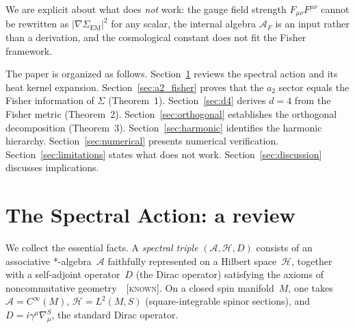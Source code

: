 \documentclass[prd,twocolumn,superscriptaddress,longbibliography]{revtex4-2}
\newcommand{\AF}{\mathcal{A}_F}
\newcommand{\known}{\textsc{[known]}}
\begin{document}
We are explicit about what does \emph{not} work: the gauge
field strength $F_{\mu\nu}F^{\mu\nu}$ cannot be rewritten as
$|\nabla\Sigma_{\mathrm{EM}}|^2$ for any scalar, the internal
algebra $\AF$ is an input rather than a derivation, and the
cosmological constant does not fit the Fisher framework.

The paper is organized as follows.
Section~\ref{sec:spectral_review} reviews the spectral action
and its heat kernel expansion.
Section~\ref{sec:a2_fisher} proves that the $a_2$ sector
equals the Fisher information of $\Sigma$ (Theorem~1).
Section~\ref{sec:d4} derives $d=4$ from the Fisher metric
(Theorem~2).
Section~\ref{sec:orthogonal} establishes the orthogonal
decomposition (Theorem~3).
Section~\ref{sec:harmonic} identifies the harmonic hierarchy.
Section~\ref{sec:numerical} presents numerical verification.
Section~\ref{sec:limitations} states what does not work.
Section~\ref{sec:discussion} discusses implications.


\section{The Spectral Action: a review}
\label{sec:spectral_review}

We collect the essential facts.
A \emph{spectral triple}
$(\mathcal{A},\mathcal{H},D)$ consists of an associative
*-algebra~$\mathcal{A}$ faithfully represented on a Hilbert
space~$\mathcal{H}$, together with a self-adjoint operator~$D$
(the Dirac operator) satisfying the axioms of noncommutative
geometry~\cite{Connes1996,vS2024}~\known.
On a closed spin manifold~$M$, one takes
$\mathcal{A}=C^\infty(M)$, $\mathcal{H}=L^2(M,S)$ (square-integrable
spinor sections), and $D=i\gamma^\mu\nabla_\mu^S$, the
standard Dirac operator.
\end{document}

